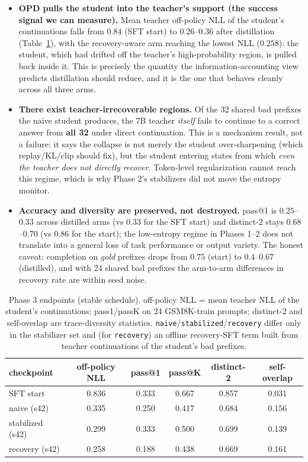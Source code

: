 \documentclass[11pt]{article}
\begin{document}
\begin{itemize}
  \item \textbf{OPD pulls the student into the teacher's support (the success signal we can measure).} Mean teacher off-policy NLL of the student's continuations falls from $0.84$ (SFT start) to $0.26$--$0.36$ after distillation (Table~\ref{tab:phase3}), with the recovery-aware arm reaching the lowest NLL ($0.258$): the student, which had drifted off the teacher's high-probability region, is pulled back inside it. This is precisely the quantity the information-accounting view predicts distillation should reduce, and it is the one that behaves cleanly across all three arms.
  \item \textbf{There exist teacher-irrecoverable regions.} Of the 32 shared bad prefixes the naive student produces, the 7B teacher \emph{itself} fails to continue to a correct answer from \textbf{all 32} under direct continuation. This is a mechanism result, not a failure: it says the collapse is not merely the student over-sharpening (which replay/KL/clip should fix), but the student entering states from which \emph{even the teacher does not directly recover}. Token-level regularization cannot reach this regime, which is why Phase 2's stabilizers did not move the entropy monitor.
  \item \textbf{Accuracy and diversity are preserved, not destroyed.} pass@1 is $0.25$--$0.33$ across distilled arms (vs $0.33$ for the SFT start) and distinct-2 stays $0.68$--$0.70$ (vs $0.86$ for the start); the low-entropy regime in Phases 1--2 does not translate into a general loss of task performance or output variety. The honest caveat: completion on \emph{gold} prefixes drops from $0.75$ (start) to $0.4$--$0.67$ (distilled), and with 24 shared bad prefixes the arm-to-arm differences in recovery rate are within seed noise.
\end{itemize}
\begin{table}[h]
\centering
\caption{Phase 3 endpoints (stable schedule). off-policy NLL = mean teacher NLL of the student's continuations; pass1/passK on 24 GSM8K-train prompts; distinct-2 and self-overlap are trace-diversity statistics. \texttt{naive}/\texttt{stabilized}/\texttt{recovery} differ only in the stabilizer set and (for \texttt{recovery}) an offline recovery-SFT term built from teacher continuations of the student's bad prefixes.}
\label{tab:phase3}
\small
\begin{tabular}{@{}lccccc@{}}
\toprule
\textbf{checkpoint} & off-policy NLL & pass@1 & pass@K & distinct-2 & self-overlap \\
\midrule
SFT start        & 0.836 & 0.333 & 0.667 & 0.857 & 0.031 \\
naive (s42)      & 0.335 & 0.250 & 0.417 & 0.684 & 0.156 \\
stabilized (s42) & 0.299 & 0.333 & 0.500 & 0.699 & 0.139 \\
recovery (s42)   & 0.258 & 0.188 & 0.438 & 0.669 & 0.161 \\
\bottomrule
\end{tabular}
\end{table}
\end{document}
